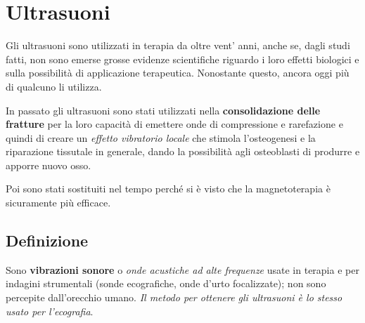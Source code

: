 \section{Ultrasuoni }

Gli ultrasuoni sono utilizzati in terapia da oltre vent' anni, anche se,
dagli studi fatti, non sono emerse grosse evidenze scientifiche riguardo
i loro effetti biologici e sulla possibilità di applicazione
terapeutica. Nonostante questo, ancora oggi più di qualcuno li utilizza.

In passato gli ultrasuoni sono stati utilizzati nella
\textbf{consolidazione delle fratture} per la loro capacità di emettere
onde di compressione e rarefazione e quindi di creare un \emph{effetto
vibratorio locale} che stimola l'osteogenesi e la riparazione tissutale
in generale, dando la possibilità agli osteoblasti di produrre e apporre
nuovo osso.

Poi sono stati sostituiti nel tempo perché si è visto che la
magnetoterapia è sicuramente più efficace.

\subsection{Definizione}

Sono \textbf{vibrazioni sonore} o \emph{onde acustiche ad alte
frequenze} usate in terapia e per indagini strumentali (sonde
ecografiche, onde d'urto focalizzate); non sono percepite dall'orecchio
umano. \emph{Il metodo per ottenere gli ultrasuoni è lo stesso usato per
l\emph{'ecografia}}.

